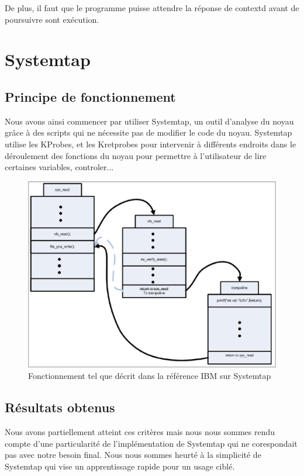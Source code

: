 \documentclass[pdftex,a4paper,titlepage,11pt,openright]{article}
\begin{document}
De plus, il faut que le programme puisse attendre la réponse de contextd avant de poursuivre sont exécution.

\section{Systemtap}

\subsection{Principe de fonctionnement}

Nous avons ainsi commencer par utiliser Systemtap, un outil d'analyse du noyau grâce à des scripts qui ne nécessite pas de modifier le code du noyau. Systemtap utilise les KProbes, et les Kretprobes\cite{IBMRBST} pour intervenir à différents endroits dans le déroulement des fonctions du noyau pour permettre à l'utilisateur de lire certaines variables, controler... %

\begin{figure}[hb]
	\centering
	\includegraphics[scale=0.4]{kretprob.png}
	\caption{Fonctionnement tel que décrit dans la référence IBM sur Systemtap \cite{IBMRBST}}
\end{figure}

\subsection{Résultats obtenus}

Nous avons partiellement atteint ces critères mais nous nous sommes rendu compte d'une particularité de l'implémentation de Systemtap qui ne corespondait pas avec notre besoin final. Nous nous sommes heurté à la simplicité de Systemtap qui vise un apprentissage rapide pour un usage ciblé.
\end{document}

